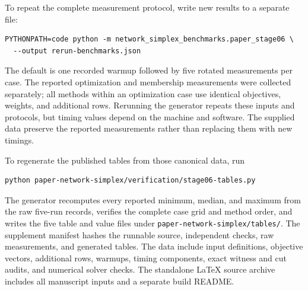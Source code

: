 To repeat the complete measurement protocol, write new results to a separate
file:
\begin{verbatim}
PYTHONPATH=code python -m network_simplex_benchmarks.paper_stage06 \
  --output rerun-benchmarks.json
\end{verbatim}
The default is one recorded warmup followed by five rotated measurements
per case. The reported optimization and membership measurements were collected
separately; all methods within an optimization case use identical objectives,
weights, and additional rows. Rerunning the generator repeats these inputs
and protocols, but timing values depend on the machine and software.
The supplied data preserve the reported measurements rather than replacing
them with new timings.

To regenerate the published tables from those canonical data, run
\begin{verbatim}
python paper-network-simplex/verification/stage06-tables.py
\end{verbatim}
The generator recomputes every reported minimum, median, and maximum from
the raw five-run records, verifies the complete case grid and method order,
and writes the five table and value files under
\texttt{paper-network-simplex/tables/}. The supplement manifest hashes the
runnable source, independent checks, raw measurements, and generated tables.
The data include input definitions, objective vectors, additional rows,
warmups, timing components, exact witness and cut audits, and numerical solver
checks. The standalone LaTeX source archive includes all manuscript inputs
and a separate build README.
